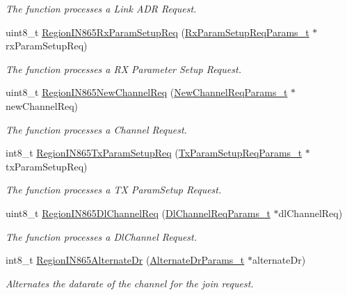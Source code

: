 \begin{DoxyCompactItemize}
\begin{DoxyCompactList}\small\item\em The function processes a Link A\+DR Request. \end{DoxyCompactList}\item 
uint8\+\_\+t \hyperlink{group__REGIONIN865_gae9b5d8d395685af5802a07527f6cd3f3}{Region\+I\+N865\+Rx\+Param\+Setup\+Req} (\hyperlink{group__REGION_ga7165f282c670c728c36d534df2285157}{Rx\+Param\+Setup\+Req\+Params\+\_\+t} $\ast$rx\+Param\+Setup\+Req)
\begin{DoxyCompactList}\small\item\em The function processes a RX Parameter Setup Request. \end{DoxyCompactList}\item 
uint8\+\_\+t \hyperlink{group__REGIONIN865_ga5448e91593496677753ad6600cedadc5}{Region\+I\+N865\+New\+Channel\+Req} (\hyperlink{group__REGION_gae2abcdb6dbb843c9faf5fd3009eca9d6}{New\+Channel\+Req\+Params\+\_\+t} $\ast$new\+Channel\+Req)
\begin{DoxyCompactList}\small\item\em The function processes a Channel Request. \end{DoxyCompactList}\item 
int8\+\_\+t \hyperlink{group__REGIONIN865_gae55f89703bdc3e0b2f2968dfa8d40b6e}{Region\+I\+N865\+Tx\+Param\+Setup\+Req} (\hyperlink{group__REGION_ga26836ef2996e70410e42ef471073f855}{Tx\+Param\+Setup\+Req\+Params\+\_\+t} $\ast$tx\+Param\+Setup\+Req)
\begin{DoxyCompactList}\small\item\em The function processes a TX Param\+Setup Request. \end{DoxyCompactList}\item 
uint8\+\_\+t \hyperlink{group__REGIONIN865_ga03ea7893369c0a1907cbae27484c485a}{Region\+I\+N865\+Dl\+Channel\+Req} (\hyperlink{group__REGION_gae0d608ff1f8ea0a430e4f9a4c38ec7f3}{Dl\+Channel\+Req\+Params\+\_\+t} $\ast$dl\+Channel\+Req)
\begin{DoxyCompactList}\small\item\em The function processes a Dl\+Channel Request. \end{DoxyCompactList}\item 
int8\+\_\+t \hyperlink{group__REGIONIN865_gae3e9117f9a867989379325cd11f2cb1a}{Region\+I\+N865\+Alternate\+Dr} (\hyperlink{group__REGION_ga001ea4338d1c83f4c785b49d7ad2d696}{Alternate\+Dr\+Params\+\_\+t} $\ast$alternate\+Dr)
\begin{DoxyCompactList}\small\item\em Alternates the datarate of the channel for the join request. \end{DoxyCompactList}\item 

\end{DoxyCompactItemize}
